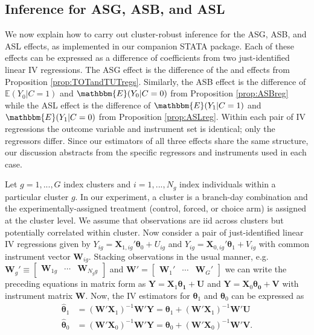\begin{appendix}
\subsection{Inference for ASG, ASB, and ASL}
\label{subsec:inference}

We now explain how to carry out cluster-robust inference for the ASG, ASB, and ASL effects, as implemented in our companion STATA package.
Each of these effects can be expressed as a difference of coefficients from two just-identified linear IV regressions.
The ASG effect is the difference of the  and  effects from Proposition \ref{prop:TOTandTUTregs}. 
Similarly, the ASB effect is the difference of $\mathbb{E}(Y_0|C=1)$ and $\mathbbm{E}(Y_0|C=0)$ from Proposition \ref{prop:ASBreg} while the ASL effect is the difference of $\mathbbm{E}(Y_1|C=1)$ and $\mathbbm{E}(Y_1|C=0)$ from Proposition \ref{prop:ASLreg}.
Within each pair of IV regressions the outcome variable and instrument set is identical; only the regressors differ. 
Since our estimators of all three effects share the same structure, our discussion abstracts from the specific regressors and instruments used in each case.

Let $g = 1, ..., G$ index clusters and $i = 1, ..., N_g$ index individuals within a particular cluster $g$. 
In our experiment, a cluster is a branch-day combination and the experimentally-assigned treatment (control, forced, or choice arm) is assigned at the cluster level.
We assume that observations are iid across clusters but potentially correlated within cluster.
Now consider a pair of just-identified linear IV regressions given by
$Y_{ig} = \boldsymbol{X}_{1,ig}' \boldsymbol{\theta}_0 + U_{ig}$ and $Y_{ig} = \boldsymbol{X}_{0,ig}' \boldsymbol{\theta}_1 + V_{ig}$ with common instrument vector $\boldsymbol{W}_{ig}$. 
Stacking observations in the usual manner, e.g.\
$\mathbf{W}_g' \equiv \begin{bmatrix}
\boldsymbol{W}_{1g} & \cdots & 
\boldsymbol{W}_{N_gg} 
\end{bmatrix}$ and 
$\mathbf{W}' = \begin{bmatrix}
\mathbf{W}_1' & \cdots & \mathbf{W}_G'
\end{bmatrix}$
we can write the preceding equations in matrix form as $\mathbf{Y} = \mathbf{X}_1\boldsymbol{\theta_1} + \mathbf{U}$ and $\mathbf{Y} = \mathbf{X}_0\boldsymbol{\theta_0} + \mathbf{V}$ with instrument matrix $\mathbf{W}$.
Now, the IV estimators for $\boldsymbol{\theta}_1$ and $\boldsymbol{\theta}_0$ can be expressed as 
\begin{align*}
\widehat{\boldsymbol{\theta}}_1 
&= \left(\mathbf{W}'\mathbf{X}_1\right)^{-1}\mathbf{W}'\mathbf{Y}  = \boldsymbol{\theta}_1 + \left(\mathbf{W}'\mathbf{X}_1\right)^{-1}\mathbf{W}'\mathbf{U}\\ 
\widehat{\boldsymbol{\theta}}_0 
&= \left(\mathbf{W}'\mathbf{X}_0\right)^{-1}\mathbf{W}'\mathbf{Y} = \boldsymbol{\theta}_0 + \left(\mathbf{W}'\mathbf{X}_0\right)^{-1}\mathbf{W}'\mathbf{V}.
\end{align*}


\end{appendix}
